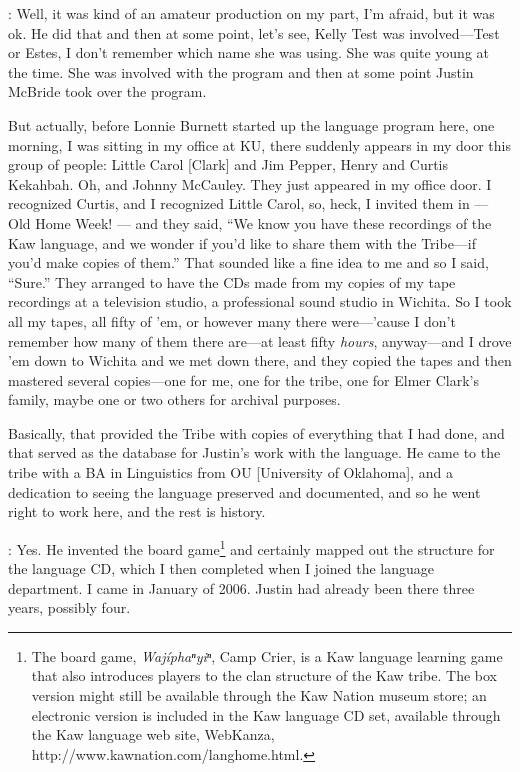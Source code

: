 \documentclass[output=paper]{LSP/langsci}
\begin{document}
: Well, it was kind of an amateur production on my part, I'm afraid, but it was ok. He did that and then at some point, let's see, Kelly Test was involved---Test or Estes, I don't remember which name she was using. She was quite young at the time. She was involved with the program and then at some point Justin McBride took over the program. 

But actually, before Lonnie Burnett started up the language program here, one morning, I was sitting in my office at KU, there suddenly appears in my door this group of people: Little Carol [Clark] and Jim Pepper, Henry and Curtis Kekahbah. Oh, and Johnny McCauley. They just appeared in my office door. I recognized Curtis, and I recognized Little Carol, so, heck, I invited them in --- Old Home Week! --- and they said, ``We know you have these recordings of the Kaw language, and we wonder if you'd like to share them with the Tribe---if you'd make copies of them.'' That sounded like a fine idea to me and so I said, ``Sure.'' They arranged to have the CDs made from my copies of my tape recordings at a television studio, a professional sound studio in Wichita. So I took all my tapes, all fifty of 'em, or however many there were---'cause I don't remember how many of them there are---at least fifty \textit{hours}, anyway---and I drove 'em down to Wichita and we met down there, and they copied the tapes and then mastered several copies---one for me, one for the tribe, one for Elmer Clark's family, maybe one or two others for archival purposes. 

Basically, that provided the Tribe with copies of everything that I had done, and that served as the database for Justin's work with the language. He came to the tribe with a BA in Linguistics from OU [University of Oklahoma], and a dedication to seeing the language preserved and documented, and so he went right to work here, and the rest is history.

: Yes. He invented the board game\footnote{The board game, \textit{Waj\'iphaⁿyiⁿ}, Camp Crier, is a Kaw language learning game that also introduces players to the clan structure of the Kaw tribe. The box version might still be available through the Kaw Nation museum store; an electronic version is included in the Kaw language CD set, available through the Kaw language web site, WebKanza, {http://www.kawnation.com/langhome.html}.} and certainly mapped out the structure for the language CD, which I then completed when I joined the language department. I came in January of 2006. Justin had already been there three years, possibly four.
\end{document}
